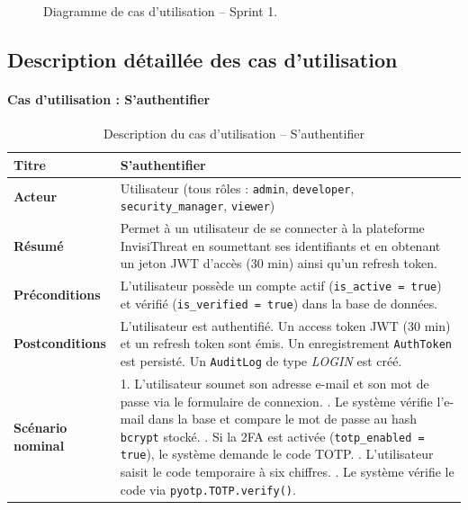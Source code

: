 \begin{figure}[H]
\centering
\fbox{\rule{0pt}{2in}\rule{0.9\linewidth}{0pt}}
\caption{Diagramme de cas d'utilisation -- Sprint 1.}
\label{fig:sprint1-use-case}
\end{figure}

\subsection{Description détaillée des cas d'utilisation}

\paragraph{Cas d'utilisation : S'authentifier}
\begin{table}[H]
\centering
\caption{Description du cas d'utilisation -- S'authentifier}
\label{tab:uc-auth}
\small
\renewcommand{\arraystretch}{1.3}
\begin{tabularx}{\textwidth}{>{\bfseries}p{3.5cm} X}
\hline
Titre & S'authentifier \\
\hline
Acteur & Utilisateur (tous rôles : \texttt{admin}, \texttt{developer}, \texttt{security\_manager}, \texttt{viewer}) \\
\hline
Résumé & Permet à un utilisateur de se connecter à la plateforme InvisiThreat en soumettant ses identifiants et en obtenant un jeton JWT d'accès (30 min) ainsi qu'un refresh token. \\
\hline
Préconditions & L'utilisateur possède un compte actif (\texttt{is\_active = true}) et vérifié (\texttt{is\_verified = true}) dans la base de données. \\
\hline
Postconditions & L'utilisateur est authentifié. Un access token JWT (30 min) et un refresh token sont émis. Un enregistrement \texttt{AuthToken} est persisté. Un \texttt{AuditLog} de type \textit{LOGIN} est créé. \\
\hline
Scénario nominal &
1. L'utilisateur soumet son adresse e-mail et son mot de passe via le formulaire de connexion. \newline
2. Le système vérifie l'e-mail dans la base et compare le mot de passe au hash \texttt{bcrypt} stocké. \newline
3. Si la 2FA est activée (\texttt{totp\_enabled = true}), le système demande le code TOTP. \newline
4. L'utilisateur saisit le code temporaire à six chiffres. \newline
5. Le système vérifie le code via \texttt{pyotp.TOTP.verify()}. \newline

\end{tabularx}
\end{table}
